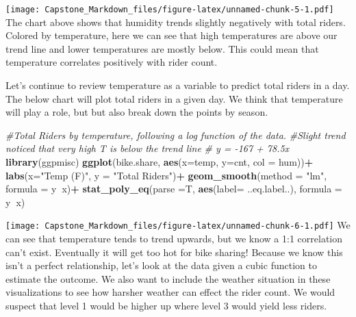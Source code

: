 \documentclass[]{article}
\newenvironment{Shaded}{\begin{snugshade}}{\end{snugshade}}
\newcommand{\KeywordTok}[1]{\textcolor[rgb]{0.13,0.29,0.53}{\textbf{#1}}}
\newcommand{\DataTypeTok}[1]{\textcolor[rgb]{0.13,0.29,0.53}{#1}}
\newcommand{\StringTok}[1]{\textcolor[rgb]{0.31,0.60,0.02}{#1}}
\newcommand{\CommentTok}[1]{\textcolor[rgb]{0.56,0.35,0.01}{\textit{#1}}}
\newcommand{\OperatorTok}[1]{\textcolor[rgb]{0.81,0.36,0.00}{\textbf{#1}}}
\newcommand{\NormalTok}[1]{#1}
\begin{document}
\texttt{[image: Capstone\_Markdown\_files/figure-latex/unnamed-chunk-5-1.pdf]}
The chart above shows that humidity trends slightly negatively with
total riders. Colored by temperature, here we can see that high
temperatures are above our trend line and lower temperatures are mostly
below. This could mean that temperature correlates positively with rider
count.

Let's continue to review temperature as a variable to predict total
riders in a day. The below chart will plot total riders in a given day.
We think that temperature will play a role, but but also break down the
points by season.

\begin{Shaded}
\begin{Highlighting}[]
\CommentTok{#Total Riders by temperature, following a log function of the data. }
\CommentTok{#Slight trend noticed that very high T is below the trend line}
\CommentTok{# y = -167 + 78.5x}
\KeywordTok{library}\NormalTok{(ggpmisc)}
\KeywordTok{ggplot}\NormalTok{(bike.share, }\KeywordTok{aes}\NormalTok{(}\DataTypeTok{x=}\NormalTok{temp, }\DataTypeTok{y=}\NormalTok{cnt, }\DataTypeTok{col =}\NormalTok{ hum))}\OperatorTok{+}
\StringTok{  }\KeywordTok{labs}\NormalTok{(}\DataTypeTok{x=}\StringTok{"Temp (F)"}\NormalTok{, }\DataTypeTok{y =} \StringTok{"Total Riders"}\NormalTok{)}\OperatorTok{+}
\StringTok{  }\KeywordTok{geom_smooth}\NormalTok{(}\DataTypeTok{method =} \StringTok{"lm"}\NormalTok{, }\DataTypeTok{formula =}\NormalTok{ y}\OperatorTok{~}\NormalTok{x)}\OperatorTok{+}
\StringTok{  }\KeywordTok{stat_poly_eq}\NormalTok{(}\DataTypeTok{parse =}\NormalTok{T, }\KeywordTok{aes}\NormalTok{(}\DataTypeTok{label=}\NormalTok{ ..eq.label..), }\DataTypeTok{formula =}\NormalTok{ y}\OperatorTok{~}\NormalTok{x)}
\end{Highlighting}
\end{Shaded}

\texttt{[image: Capstone\_Markdown\_files/figure-latex/unnamed-chunk-6-1.pdf]}
We can see that temperature tends to trend upwards, but we know a 1:1
correlation can't exist. Eventually it will get too hot for bike
sharing! Because we know this isn't a perfect relationship, let's look
at the data given a cubic function to estimate the outcome. We also want
to include the weather situation in these visualizations to see how
harsher weather can effect the rider count. We would suspect that level
1 would be higher up where level 3 would yield less riders.
\end{document}
